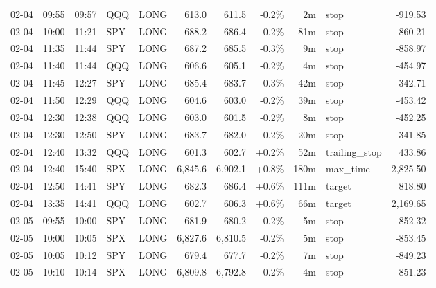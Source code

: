 \documentclass[11pt,a4paper,twoside]{article}
\begin{document}
\begin{center}
\begin{longtable}{>{\color{txtmain}}l l l l l r r r r >{\color{txtmain}}l r}
02-04 & 09:55 & 09:57 & QQQ & LONG & 613.0 & 611.5 & \textcolor{lossred}{-0.2\%} & 2m & stop & \textcolor{lossred}{-919.53} \\
02-04 & 10:00 & 11:21 & SPY & LONG & 688.2 & 686.4 & \textcolor{lossred}{-0.2\%} & 81m & stop & \textcolor{lossred}{-860.21} \\
02-04 & 11:35 & 11:44 & SPY & LONG & 687.2 & 685.5 & \textcolor{lossred}{-0.3\%} & 9m & stop & \textcolor{lossred}{-858.97} \\
02-04 & 11:40 & 11:44 & QQQ & LONG & 606.6 & 605.1 & \textcolor{lossred}{-0.2\%} & 4m & stop & \textcolor{lossred}{-454.97} \\
02-04 & 11:45 & 12:27 & SPY & LONG & 685.4 & 683.7 & \textcolor{lossred}{-0.3\%} & 42m & stop & \textcolor{lossred}{-342.71} \\
02-04 & 11:50 & 12:29 & QQQ & LONG & 604.6 & 603.0 & \textcolor{lossred}{-0.2\%} & 39m & stop & \textcolor{lossred}{-453.42} \\
02-04 & 12:30 & 12:38 & QQQ & LONG & 603.0 & 601.5 & \textcolor{lossred}{-0.2\%} & 8m & stop & \textcolor{lossred}{-452.25} \\
02-04 & 12:30 & 12:50 & SPY & LONG & 683.7 & 682.0 & \textcolor{lossred}{-0.2\%} & 20m & stop & \textcolor{lossred}{-341.85} \\
02-04 & 12:40 & 13:32 & QQQ & LONG & 601.3 & 602.7 & \textcolor{wingreen}{+0.2\%} & 52m & trailing\_stop & \textcolor{wingreen}{433.86} \\
02-04 & 12:40 & 15:40 & SPX & LONG & 6,845.6 & 6,902.1 & \textcolor{wingreen}{+0.8\%} & 180m & max\_time & \textcolor{wingreen}{2,825.50} \\
02-04 & 12:50 & 14:41 & SPY & LONG & 682.3 & 686.4 & \textcolor{wingreen}{+0.6\%} & 111m & target & \textcolor{wingreen}{818.80} \\
02-04 & 13:35 & 14:41 & QQQ & LONG & 602.7 & 606.3 & \textcolor{wingreen}{+0.6\%} & 66m & target & \textcolor{wingreen}{2,169.65} \\
02-05 & 09:55 & 10:00 & SPY & LONG & 681.9 & 680.2 & \textcolor{lossred}{-0.2\%} & 5m & stop & \textcolor{lossred}{-852.32} \\
02-05 & 10:00 & 10:05 & SPX & LONG & 6,827.6 & 6,810.5 & \textcolor{lossred}{-0.2\%} & 5m & stop & \textcolor{lossred}{-853.45} \\
02-05 & 10:05 & 10:12 & SPY & LONG & 679.4 & 677.7 & \textcolor{lossred}{-0.2\%} & 7m & stop & \textcolor{lossred}{-849.23} \\
02-05 & 10:10 & 10:14 & SPX & LONG & 6,809.8 & 6,792.8 & \textcolor{lossred}{-0.2\%} & 4m & stop & \textcolor{lossred}{-851.23} \\

\end{longtable}
\end{center}
\end{document}
